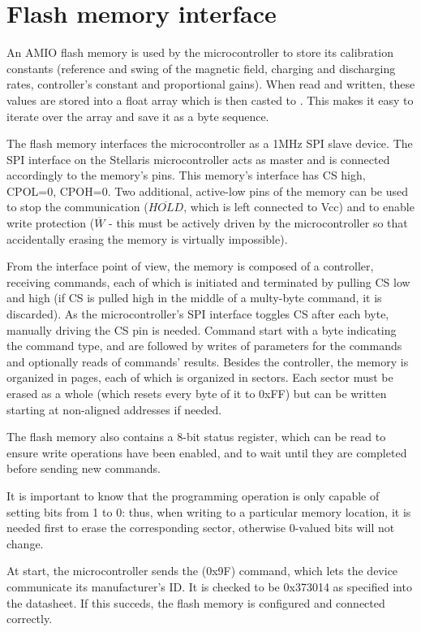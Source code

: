 \section{Flash memory interface}
An AMIO flash memory is used by the microcontroller to store its calibration constants (reference and swing of the magnetic field, charging and discharging rates, controller's constant and proportional gains). When read and written, these values are stored into a float array which is then casted to . This makes it easy to iterate over the array and save it as a byte sequence.

The flash memory interfaces the microcontroller as a 1MHz SPI slave device. The SPI interface on the Stellaris microcontroller acts as master and is connected accordingly to the memory's pins. This memory's interface has CS high, CPOL=0, CPOH=0. Two additional, active-low pins of the memory can be used to stop the communication ($\overline{HOLD}$, which is left connected to Vcc) and to enable write protection ($\overline{W}$ - this must be actively driven by the microcontroller so that accidentally erasing the memory is virtually impossible).

From the interface point of view, the memory is composed of a controller, receiving commands, each of which is initiated and terminated by pulling CS low and high (if CS is pulled high in the middle of a multy-byte command, it is discarded). As the microcontroller's SPI interface toggles CS after each byte, manually driving the CS pin is needed. Command start with a byte indicating the command type, and are followed by writes of parameters for the commands and optionally reads of commands' results. Besides the controller, the memory is organized in pages, each of which is organized in sectors. Each sector must be erased as a whole (which resets every byte of it to 0xFF) but can be written starting at non-aligned addresses if needed.

The flash memory also contains a 8-bit status register, which can be read to ensure write operations have been enabled, and to wait until they are completed before sending new commands.

It is important to know that the programming operation is only capable of setting bits from 1 to 0: thus, when writing to a particular memory location, it is needed first to erase the corresponding sector, otherwise 0-valued bits will not change.

At start, the microcontroller sends the  (0x9F) command, which lets the device communicate its manufacturer's ID. It is checked to be 0x373014 as specified into the datasheet. If this succeds, the flash memory is configured and connected correctly.

